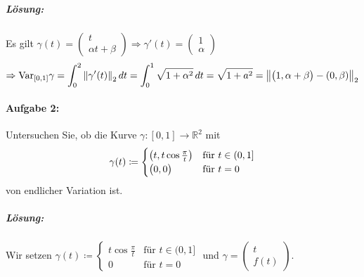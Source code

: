 \documentclass{scrreprt}
\begin{document}
\begin{enumerate}[(i)]
  \subparagraph{Lösung:}
  \begin{center}
  \end{center}
  Es gilt $\gamma(t) = \begin{pmatrix}
    t \\
    \alpha t + \beta
  \end{pmatrix} \Rightarrow \gamma'(t) = \begin{pmatrix}
    1 \\
    \alpha
  \end{pmatrix}$
  \[
    \Rightarrow \text{Var}_{[0, 1]}\gamma = \int_0^2\norm{\gamma'(t)}_2\,dt
    = \int_0^1\sqrt{1 + \alpha^2}\,dt = \sqrt{1 + a^2}
    = \norm{\qty\big(1, \alpha + \beta) - \qty(0, \beta)}_2
  \]

\end{enumerate}
\newpage
\paragraph{Aufgabe 2:} Untersuchen Sie, ob die Kurve
$\gamma \colon [0, 1] \to \mathbb{R}^2$ mit
\[
  \gamma(t) \coloneqq \begin{cases}
    \qty(t, t\cos\frac{\pi}{t}) & \text{für } t \in (0, 1] \\
    \qty\big(0, 0) & \text{für } t = 0
  \end{cases}
\]
von endlicher Variation ist.

\subparagraph{Lösung:} Wir setzen $\gamma(t) \coloneqq \begin{cases}
  t\cos\frac{\pi}{t} & \text{für } t \in (0, 1] \\
  0 & \text{für } t = 0
\end{cases}$ und $\gamma = \begin{pmatrix}
  t \\
  f(t)
\end{pmatrix}$.
\end{document}
